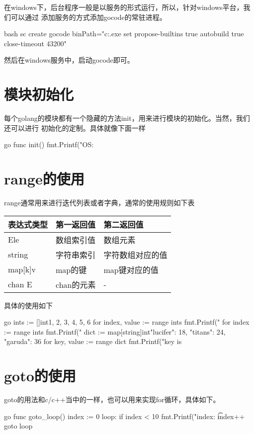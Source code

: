 在windows下，后台程序一般是以服务的形式运行，所以，针对windows平台，我们可以通过
添加服务的方式添加gocode的常驻进程。
\begin{code-block}{bash}
sc create gocode binPath="c:\go\bin\gocode.exe set propose-builtins true autobuild true close-timeout 43200"
\end{code-block}
然后在windows服务中，启动gocode即可。

\section{模块初始化}
每个golang的模块都有一个隐藏的方法init，用来进行模块的初始化。当然，我们还可以进行
初始化的定制。具体就像下面一样
\begin{code-block}{go}
func init() {
    fmt.Printf("OS: %
}
\end{code-block}

\section{range的使用}
range通常用来进行迭代列表或者字典，通常的使用规则如下表
\begin{center}
  \begin{tabularx}{\textwidth}{|X|X|X|}
  \hline
  表达式类型& 第一返回值& 第二返回值\\ \hline
  [n]Ele& 数组索引值& 数组元素 \\
  string& 字符串索引& 字符数组对应的值\\
  map[k]v& map的键 & map键对应的值\\
  chan E & chan的元素 & - \\ \hline
  \end{tabularx}
  \label{tab:usage_of_range}
\end{center}

具体的使用如下
\begin{code-block}{go}
ints := []int{1, 2, 3, 4, 5, 6}
for index, value := range ints {
    fmt.Printf("%
}
for index := range ints {
    fmt.Printf("%
}
dict := map[string]int{"lucifer": 18, "titans": 24, "garuda": 36}
for key, value := range dict {
    fmt.Printf("key is %
}
\end{code-block}

\section{goto的使用}
goto的用法和c/c++当中的一样，也可以用来实现for循环，具体如下。
\begin{code-block}{go}
func goto_loop() {
    index := 0
loop:
    if index < 10 {
        fmt.Printf("index: \t%
        index++
        goto loop
    }
}
\end{code-block}

